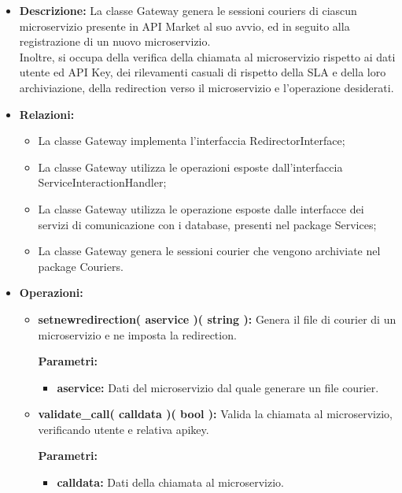 \begin{itemize}
	\item \textbf{Descrizione:} La classe Gateway genera le sessioni couriers di ciascun microservizio presente in API Market al suo avvio, ed in seguito alla registrazione di un nuovo microservizio.\\
	Inoltre, si occupa della verifica della chiamata al microservizio rispetto ai dati utente ed API Key, dei rilevamenti casuali di rispetto della SLA e della loro archiviazione, della redirection verso il microservizio e l'operazione desiderati.
	\item \textbf{Relazioni:}
		\begin{itemize}
			\item La classe Gateway implementa l'interfaccia RedirectorInterface;
			\item La classe Gateway utilizza le operazioni esposte dall'interfaccia ServiceInteractionHandler;
			\item La classe Gateway utilizza le operazione esposte dalle interfacce dei servizi di comunicazione con i database, presenti nel package Services;
			\item La classe Gateway genera le sessioni courier che vengono archiviate nel package Couriers.
		\end{itemize}
	\item \textbf{Operazioni:}
		\begin{itemize}
			\item \textbf{setnewredirection( aservice )( string ):} Genera il file di courier di un microservizio e ne imposta la redirection.
				\begin{description}
    				\item[\textbf{Parametri:}]
				\end{description}
				\begin{itemize}
					\item \textbf{aservice:} Dati del microservizio dal quale generare un file courier. 
				\end{itemize}
			\item \textbf{validate\_call( calldata )( bool ):} Valida la chiamata al microservizio, verificando utente e relativa apikey. 
				\begin{description}
    				\item[\textbf{Parametri:}]
				\end{description}
				\begin{itemize}
					\item \textbf{calldata:} Dati della chiamata al microservizio.

\end{itemize}
\end{itemize}
\end{itemize}
